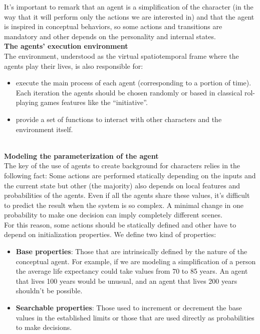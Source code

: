 \documentclass{sig-alternate}
\begin{document}
It's important to remark that an agent is a simplification of the character (in the way that it will perform only the actions we are interested in) and that the agent is inspired in conceptual behaviors, so some actions and transitions are mandatory and other depends on the personality and internal states.\\

\textbf{The agents' execution environment}\\

The environment, understood as the virtual spatiotemporal frame where the agents play their lives, is also responsible for:
\begin{itemize}
\item execute the main process of each agent (corresponding to a portion of time). Each iteration the agents should be chosen randomly or based in classical rol-playing games features like the ``initiative''.
\item provide a set of functions to interact with other characters and the environment itself.
\end{itemize}\\


\textbf{Modeling the parameterization of the agent}\\

The key of the use of agents to create background for characters relies in the following fact: Some actions are performed statically depending on the inputs and the current state but other (the majority) also depends on local features and probabilities of the agents. Even if all the agents share these values, it's difficult to predict the result when the system is so complex. A minimal change in one probability to make one decision can imply completely different scenes.\\

For this reason, some actions should be statically defined and other have to depend on initialization properties. We define two kind of properties:

\begin{itemize}
\item \textbf{Base properties}: Those that are intrinsically defined by the nature of the conceptual agent. For example, if we are modeling a simplification of a person the average life expectancy could take values from 70 to 85 years. An agent that lives 100 years would be unusual, and an agent that lives 200 years shouldn't be possible.
\item \textbf{Searchable properties}: Those used to increment or decrement the base values in the established limits or those that are used directly as probabilities to make decisions.
\end{itemize}\\
\end{document}

